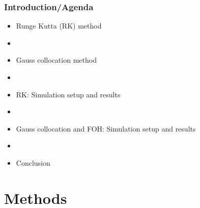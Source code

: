 \documentclass[student, noshadow, lsr, english, aspectratio=169]{ITR_LSR_slides}
\begin{document}
\begin{frame}
	\frametitle{Introduction/Agenda}
    \begin{itemize}
    	\item Runge Kutta (RK) method
    	\item[~]  
    	\item Gauss collocation method
    	\item[~]
    	\item RK: Simulation setup and results
    	\item[~]
    	\item Gauss collocation and FOH: Simulation setup and results
    	\item[~]
    	\item Conclusion
    \end{itemize}

\end{frame}


\section{Methods}
\end{document}
